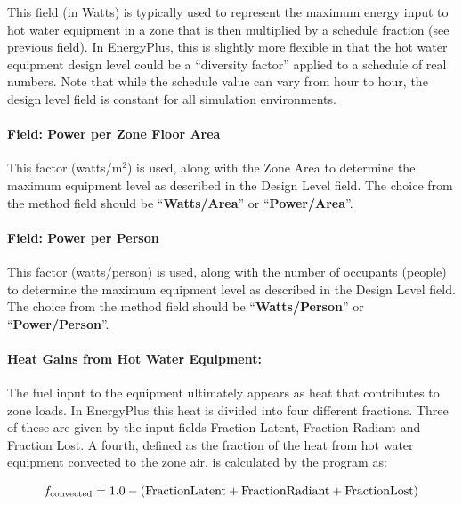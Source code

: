 This field (in Watts) is typically used to represent the maximum energy input to hot water equipment in a zone that is then multiplied by a schedule fraction (see previous field). In EnergyPlus, this is slightly more flexible in that the hot water equipment design level could be a ``diversity factor'' applied to a schedule of real numbers. Note that while the schedule value can vary from hour to hour, the design level field is constant for all simulation environments.

\paragraph{Field: Power per Zone Floor Area}\label{field-power-per-zone-floor-area-1}

This factor (watts/m\(^{2}\)) is used, along with the Zone Area to determine the maximum equipment level as described in the Design Level field. The choice from the method field should be ``\textbf{Watts/Area}'' or ``\textbf{Power/Area}''.

\paragraph{Field: Power per Person}\label{field-power-per-person-1}

This factor (watts/person) is used, along with the number of occupants (people) to determine the maximum equipment level as described in the Design Level field. The choice from the method field should be ``\textbf{Watts/Person}'' or ``\textbf{Power/Person}''.

\paragraph{Heat Gains from Hot Water Equipment:}\label{heat-gains-from-hot-water-equipment}

The fuel input to the equipment ultimately appears as heat that contributes to zone loads. In EnergyPlus this heat is divided into four different fractions. Three of these are given by the input fields Fraction Latent, Fraction Radiant and Fraction Lost. A fourth, defined as the fraction of the heat from hot water equipment convected to the zone air, is calculated by the program as:

\begin{equation}
  f_{\rm{convected}} = 1.0 - (\rm{Fraction Latent} + \rm{Fraction Radiant} + \rm{Fraction Lost})
\end{equation}

